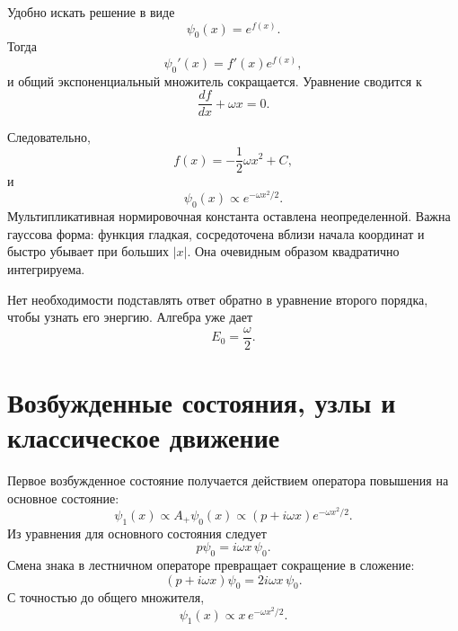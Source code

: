 \begin{classroomqa}
\end{classroomqa}

Удобно искать решение в виде
\begin{equation}
\psi_{0}(x)=e^{f(x)}.
\end{equation}
Тогда
\[
\psi_{0}'(x)=f'(x)e^{f(x)},
\]
и общий экспоненциальный множитель сокращается. Уравнение сводится к
\begin{equation}
\frac{df}{dx}+\omega x=0.
\end{equation}

\begin{classroomqa}
\end{classroomqa}

Следовательно,
\begin{equation}
f(x)=-\frac12\omega x^{2}+C,
\end{equation}
и
\begin{equation}
\psi_{0}(x)\propto e^{-\omega x^{2}/2}.
\end{equation}
Мультипликативная нормировочная константа оставлена неопределенной. Важна гауссова форма: функция гладкая, сосредоточена вблизи начала координат и быстро убывает при больших \(\lvert x\rvert\). Она очевидным образом квадратично интегрируема.

Нет необходимости подставлять ответ обратно в уравнение второго порядка, чтобы узнать его энергию. Алгебра уже дает
\begin{equation}
E_{0}=\frac{\omega}{2}.
\end{equation}

\section{Возбужденные состояния, узлы и классическое движение}

Первое возбужденное состояние получается действием оператора повышения на основное состояние:
\begin{equation}
\psi_{1}(x)\propto A_{+}\psi_{0}(x)
\propto(p+i\omega x)e^{-\omega x^{2}/2}.
\end{equation}
Из уравнения для основного состояния следует
\[
p\psi_{0}=i\omega x\,\psi_{0}.
\]
Смена знака в лестничном операторе превращает сокращение в сложение:
\begin{equation}
(p+i\omega x)\psi_{0}
=2i\omega x\,\psi_{0}.
\end{equation}
С точностью до общего множителя,
\begin{equation}
\psi_{1}(x)\propto x\,e^{-\omega x^{2}/2}.
\end{equation}

